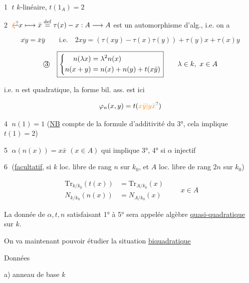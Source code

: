 
\textcircled{1} $t$  $k$-linéaire, $\boxed{t(1_A)=2}$

\textcircled{2} $\deleted{\unsure{\xi}}x\longmapsto\bar x\overset{\mathrm{def}}{=}\tau(x)-x:A\longrightarrow A$ est un automorphisme d'alg., i.e. on a


\[
\boxed{\overline{xy}=\bar x\bar y}\qquad\text{i.e.}\quad
2xy=(\tau(xy)-\tau(x)\tau(y))+\tau(y)x+\tau(x)y
\]

\[
\text{\textcircled{3}}\quad\boxed{\left\{\begin{aligned}
n(\lambda x)&=\lambda^2n(x)\\
n(x+y)&=n(x)+n(y)+t(x\bar y)
\end{aligned}\right.}\qquad\lambda\in k,\ x\in A
\]

i.e. $n$ est quadratique, la forme bil. ass. est ici

\[
\varphi_n(x,y)=t(\unsure{x\bar y|y\bar x})
\]

\textcircled{4} $\boxed{n(1)=1}$ (\uline{NB} compte  de la formule d'additivité du 3°, cela implique $t(1)=2$)

\textcircled{5} $\boxed{\alpha(n(x))=x\bar x}$ $(x\in A)$ qui implique 3°, 4° si $\alpha$ injectif

\textcircled{6} (\uline{facultatif}, \deleted{)} si $k$ loc. libre de rang $n$ sur $k_0$, et $A$ loc. libre de rang $2n$ sur $k_0$)

\[
\boxed{\begin{aligned}
\mathrm{Tr}_{k/k_0}(t(x))&=\mathrm{Tr}_{A/k_0}(x)\\
N_{k/k_0}(n(x))&=N_{A/k_0}(x)
\end{aligned}}\qquad x\in A
\]

La donnée de  $\alpha,t,n$ satisfaisant 1° à 5° sera appelée algèbre \uline{quasi-quadratique} sur $k$.

On va maintenant pouvoir étudier la situation \uline{biquadratique}



Données

a) anneau de base $k$

